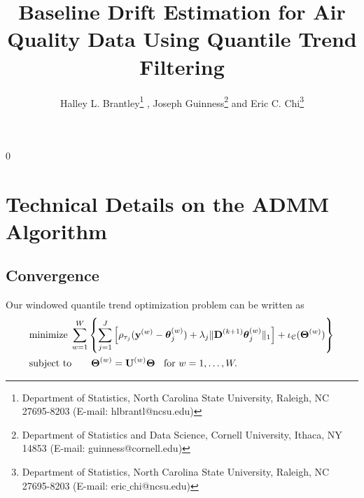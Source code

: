 \documentclass[12pt]{article}
\newcommand{\blind}{0}
\numberwithin{equation}{section}
\theoremstyle{plain}
\newcommand{\V}[1]{{\bm{\mathbf{\MakeLowercase{#1}}}}} %
\newcommand{\Vn}[2]{\V{#1}^{(#2)}} %
\newcommand{\M}[1]{{\bm{\mathbf{\MakeUppercase{#1}}}}} %
\newcommand{\Mn}[2]{\M{#1}^{(#2)}} %
\begin{document}
\def\spacingset#1{\renewcommand{\baselinestretch}%
{#1}\small\normalsize} \spacingset{1}




\blind
{
  \title{\bf Baseline Drift Estimation for Air Quality Data Using Quantile Trend Filtering}
  \author{Halley L. Brantley\thanks{Department of Statistics, North Carolina State University, Raleigh, NC 27695-8203 (E-mail: hlbrantl@ncsu.edu)} ,    
    Joseph Guinness\thanks{Department of Statistics and Data Science, Cornell University, Ithaca, NY 14853 (E-mail: guinness@cornell.edu)} 
    and
    Eric C. Chi\thanks{Department of Statistics, North Carolina State University, Raleigh, NC 27695-8203 (E-mail: eric$\_$chi@ncsu.edu)} \\}
    \date{}
  \maketitle
} \fi

\bigskip

\spacingset{1.45}

\section{Technical Details on the ADMM Algorithm}

\subsection{Convergence}
 Our windowed quantile trend optimization problem can be written as
 \begin{equation}
 \label{eq:quantile_windows}
 \begin{split}
 &\text{minimize}\; \sum_{w=1}^W \left \{\sum_{j=1}^J \left [\rho_{\tau_j}(\Vn{y}{w} - \Vn{\theta}{w}_{j}) +
 \lambda_j \lVert \Mn{D}{k+1} \Vn{\theta}{w}_{j} \rVert_1 \right ] + \iota_\mathcal{C}(\Mn{\Theta}{w}) \right\}\\
 &\text{subject to} \qquad \Mn{\Theta}{w} = \Mn{U}{w}\M{\Theta} \;\; \text{ for } w = 1, \ldots, W.
 \end{split}
 \end{equation}
\end{document}
